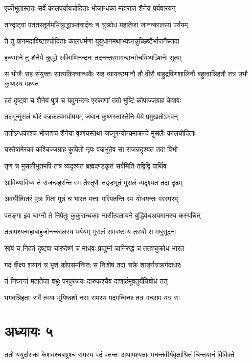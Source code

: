 \twolineshloka
{एकीभूतास्ततः सर्वे कालपर्यायचोदिताः}
{भोजान्धका महाराज शैनेयं पर्यवारयन्}


\twolineshloka
{तान्दृष्ट्वा पततस्तूर्णमभिक्रुद्धाञ्जनार्दनः}
{न चुक्रोध महातेजा जानन्कालस्य पर्ययम्}


\twolineshloka
{ते तु पानमदाविष्टाश्चोदिताः कालधर्मणा}
{युयुधानमथाभ्यघ्नन्नुच्छिष्टैर्भाजनैस्तदा}


\twolineshloka
{हन्यमाने तु शैनेये क्रुद्धो रुक्मिणिनन्दनः}
{तदनन्तरमागच्छन्मोचयिष्यञ्शिनेः सुतम्}


\threelineshloka
{स भोजैः सह संयुक्तः सात्यकिश्चान्धकैः सह}
{व्यायच्छमानौ तौ वीरौ बाहुद्रविणशालिनौ}
{बहुत्वान्निहतौ तत्र उभौ कुष्णस्य पश्यतः}


\twolineshloka
{हतं दृष्ट्वा च शैनेयं पुत्रं च यदुनन्दनः}
{एरकाणां ततो मुष्टिं कोपाज्जग्राह केशवः}


\twolineshloka
{तदभून्मुसलं घोरं वज्रकल्पमयोमयम्}
{जघान कुष्णस्तांस्तेनि येये प्रमुखतोऽभवन्}


\twolineshloka
{ततोऽन्धकाश्च भोजाश्च शैनेया वृष्णयस्तथा}
{जघ्नुरन्योन्यमाक्रन्दे मुसलैः कालचोदिताः}


\twolineshloka
{यस्तेषामेरकां कश्चिज्जग्राह कुपितो नृपः}
{वज्रभूतेव सा राजन्नदृश्यत तदा विभो}


\twolineshloka
{तृणं च मुसलीभूतमपि तत्र व्यदृश्यत}
{ब्रह्मदण्डकृतं सर्वमिति तद्विद्वि पार्थिव}


\twolineshloka
{आविध्याविध्य ते राजन्प्रहरन्ति स्म तैस्तृणैः}
{तद्वज्रभूतं मुसलं व्यदृश्यत तदा दृढम्}


\twolineshloka
{अवधीत्पितरं पुत्रः पिता पुत्रं च भारत}
{मत्ताः परिपतन्ति स्म योधयन्तः परस्परम्}


\twolineshloka
{पतङ्गा इव चाग्नौ ते निपेतुः कुकुरान्धकाः}
{नासीत्पलायने बुद्धिर्वधअयमानस्य कस्यचित्}


\twolineshloka
{तत्रापश्यन्महाबाहुर्जानन्कालस्य पर्ययम्}
{मुसलं समवष्टभ्य तस्थौ स मधुसूदनः}


\twolineshloka
{सांबं च निहतं दृष्ट्वा चारुदेष्णं च माधवः}
{प्रद्युम्नं चानिरुद्धं च ततश्चुक्रोध भारत}


\twolineshloka
{गदं वीक्ष्य शयानं च भृशं कोपसमन्वितः}
{स निःशेषं तदा चक्रे शार्ङ्गचक्रगंदाधरः}


\twolineshloka
{तं निघ्नन्तं महातेजा बभ्रुः परपुरंजयः}
{दारुकश्चैव दाशार्हमूवतुर्यन्निबोध तत्}


\twolineshloka
{भगवन्निहताः सर्वे त्वया भूयिष्ठशो नराः}
{रामस्य पदमन्विच्छ तत्र गच्छाम यत्र सः}


\chapter{अध्यायः ५}
\threelineshloka
{ततो ययुर्दारुकः केशवश्चबभ्रुश्च रामस्य पदं पतन्तः}
{अथापश्यन्राममनन्तवीर्यंवृक्षाश्रितं चिन्तयानं विविक्ते}
{}



